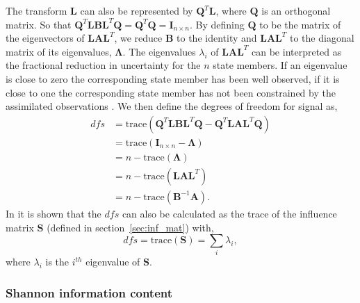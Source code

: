 \documentclass[11pt]{article}
\begin{document}
The transform $\textbf{L}$ can also be represented by $\textbf{Q}^{T}\textbf{L}$, where $\textbf{Q}$ is an orthogonal matrix. So that $\textbf{Q}^{T}\textbf{L}\textbf{B}\textbf{L}^{T}\textbf{Q} = \textbf{Q}^{T}\textbf{Q} = \textbf{I}_{n \times n}$. By defining $\textbf{Q}$ to be the matrix of the eigenvectors of $\textbf{L}\textbf{A}\textbf{L}^{T}$, we reduce $\textbf{B}$ to the identity and $\textbf{L}\textbf{A}\textbf{L}^{T}$ to the diagonal matrix of its eigenvalues, $\bm{\Lambda}$. The eigenvalues $\lambda_{i}$ of $\textbf{L}\textbf{A}\textbf{L}^{T}$ can be interpreted as the fractional reduction in uncertainty for the $n$ state members. If an eigenvalue is close to zero the corresponding state member has been well observed, if it is close to one the corresponding state member has not been constrained by the assimilated observations \citep{stewart2008correlated}. We then define the degrees of freedom for signal as,
\begin{equation}
\begin{split}
dfs & = \text{trace}(\textbf{Q}^{T}\textbf{L}\textbf{B}\textbf{L}^{T}\textbf{Q} - \textbf{Q}^{T}\textbf{L}\textbf{A}\textbf{L}^{T}\textbf{Q}) \\
       & = \text{trace}(\mathbf{I}_{n\times n} - \bm{\Lambda}) \\
       & = n - \text{trace}(\bm{\Lambda}) \\
       & = n - \text{trace}(\textbf{L}\textbf{A}\textbf{L}^{T}) \\
       & = n - \text{trace}(\mathbf{B}^{-1}\mathbf{A}). \label{eqn:dfs}
\end{split}
\end{equation}
In \citet{rodgers2000inverse} it is shown that the $dfs$ can also be calculated as the trace of the influence matrix $\textbf{S}$ (defined in section~\ref{sec:inf_mat}) with,
\begin{equation}
dfs = \text{trace}(\textbf{S}) = \sum_{i} \lambda_{i},
\end{equation}
where $\lambda_{i}$ is the $i^{th}$ eigenvalue of $\textbf{S}$.

\subsubsection{Shannon information content}%
\end{document}
